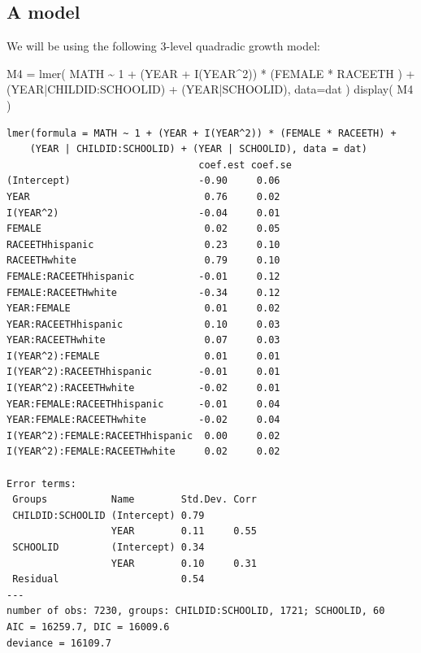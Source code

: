 \documentclass[
  letterpaper,
  DIV=11,
  numbers=noendperiod]{scrreprt}
\newenvironment{Shaded}{\begin{snugshade}}{\end{snugshade}}
\newcommand{\AttributeTok}[1]{\textcolor[rgb]{0.49,0.56,0.16}{#1}}
\newcommand{\DecValTok}[1]{\textcolor[rgb]{0.25,0.63,0.44}{#1}}
\newcommand{\FunctionTok}[1]{\textcolor[rgb]{0.02,0.16,0.49}{#1}}
\newcommand{\NormalTok}[1]{\textcolor[rgb]{0.00,0.44,0.13}{#1}}
\newcommand{\OtherTok}[1]{\textcolor[rgb]{0.00,0.44,0.13}{#1}}
\newcommand{\SpecialCharTok}[1]{\textcolor[rgb]{0.25,0.44,0.63}{#1}}
\begin{document}
\hypertarget{a-model}{%
\subsection{A model}\label{a-model}}

We will be using the following 3-level quadradic growth model:

\begin{Shaded}
\begin{Highlighting}[]
\NormalTok{M4 }\OtherTok{=} \FunctionTok{lmer}\NormalTok{( MATH }\SpecialCharTok{\textasciitilde{}} \DecValTok{1} \SpecialCharTok{+}\NormalTok{ (YEAR }\SpecialCharTok{+} \FunctionTok{I}\NormalTok{(YEAR}\SpecialCharTok{\^{}}\DecValTok{2}\NormalTok{)) }\SpecialCharTok{*}\NormalTok{ (FEMALE }\SpecialCharTok{*}\NormalTok{ RACEETH ) }\SpecialCharTok{+} 
\NormalTok{                (YEAR}\SpecialCharTok{|}\NormalTok{CHILDID}\SpecialCharTok{:}\NormalTok{SCHOOLID) }\SpecialCharTok{+}\NormalTok{ (YEAR}\SpecialCharTok{|}\NormalTok{SCHOOLID), }\AttributeTok{data=}\NormalTok{dat )}
\FunctionTok{display}\NormalTok{( M4 )}
\end{Highlighting}
\end{Shaded}

\begin{verbatim}
lmer(formula = MATH ~ 1 + (YEAR + I(YEAR^2)) * (FEMALE * RACEETH) + 
    (YEAR | CHILDID:SCHOOLID) + (YEAR | SCHOOLID), data = dat)
                                 coef.est coef.se
(Intercept)                      -0.90     0.06  
YEAR                              0.76     0.02  
I(YEAR^2)                        -0.04     0.01  
FEMALE                            0.02     0.05  
RACEETHhispanic                   0.23     0.10  
RACEETHwhite                      0.79     0.10  
FEMALE:RACEETHhispanic           -0.01     0.12  
FEMALE:RACEETHwhite              -0.34     0.12  
YEAR:FEMALE                       0.01     0.02  
YEAR:RACEETHhispanic              0.10     0.03  
YEAR:RACEETHwhite                 0.07     0.03  
I(YEAR^2):FEMALE                  0.01     0.01  
I(YEAR^2):RACEETHhispanic        -0.01     0.01  
I(YEAR^2):RACEETHwhite           -0.02     0.01  
YEAR:FEMALE:RACEETHhispanic      -0.01     0.04  
YEAR:FEMALE:RACEETHwhite         -0.02     0.04  
I(YEAR^2):FEMALE:RACEETHhispanic  0.00     0.02  
I(YEAR^2):FEMALE:RACEETHwhite     0.02     0.02  

Error terms:
 Groups           Name        Std.Dev. Corr 
 CHILDID:SCHOOLID (Intercept) 0.79          
                  YEAR        0.11     0.55 
 SCHOOLID         (Intercept) 0.34          
                  YEAR        0.10     0.31 
 Residual                     0.54          
---
number of obs: 7230, groups: CHILDID:SCHOOLID, 1721; SCHOOLID, 60
AIC = 16259.7, DIC = 16009.6
deviance = 16109.7 
\end{verbatim}
\end{document}
